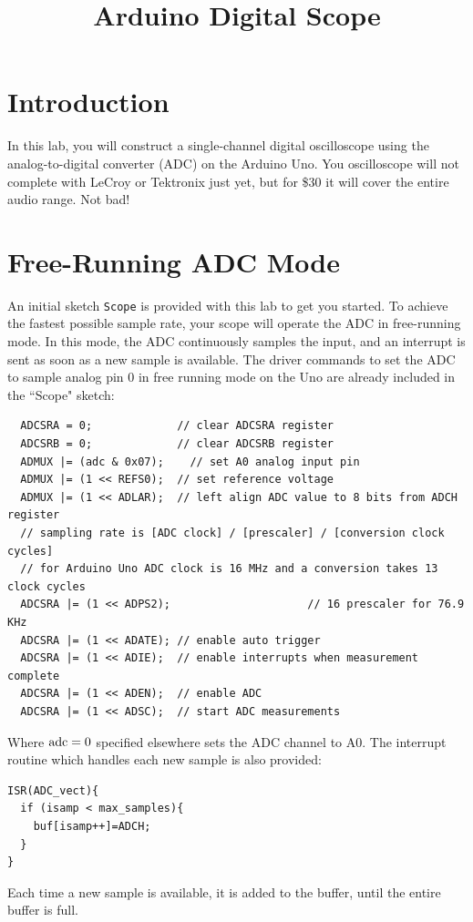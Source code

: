 \documentclass[12pt]{article}
\begin{document}
\title{Arduino Digital Scope} 

\maketitle

\section{Introduction}

In this lab, you will construct a single-channel digital oscilloscope using the analog-to-digital converter (ADC) on the Arduino Uno.  You oscilloscope will not complete with LeCroy or Tektronix just yet, but for \$30 it will cover the entire audio range.  Not bad!

\section{Free-Running ADC Mode}

An initial sketch {\tt Scope} is provided with this lab to get you started.  To achieve the fastest possible sample rate, your scope will operate the ADC in free-running mode.  In this mode, the ADC continuously samples the input, and an interrupt is sent as soon as a new sample is available.  The driver commands to set the ADC to sample analog pin 0 in free running mode on the Uno are already included in the ``Scope" sketch:
 \begin{verbatim}
  ADCSRA = 0;             // clear ADCSRA register
  ADCSRB = 0;             // clear ADCSRB register
  ADMUX |= (adc & 0x07);    // set A0 analog input pin
  ADMUX |= (1 << REFS0);  // set reference voltage
  ADMUX |= (1 << ADLAR);  // left align ADC value to 8 bits from ADCH register
  // sampling rate is [ADC clock] / [prescaler] / [conversion clock cycles]
  // for Arduino Uno ADC clock is 16 MHz and a conversion takes 13 clock cycles
  ADCSRA |= (1 << ADPS2);                     // 16 prescaler for 76.9 KHz
  ADCSRA |= (1 << ADATE); // enable auto trigger
  ADCSRA |= (1 << ADIE);  // enable interrupts when measurement complete
  ADCSRA |= (1 << ADEN);  // enable ADC
  ADCSRA |= (1 << ADSC);  // start ADC measurements
\end{verbatim}
Where $\rm adc=0$ specified elsewhere sets the ADC channel to A0.  The interrupt routine which handles each new sample is also provided:
\begin{verbatim}
ISR(ADC_vect){
  if (isamp < max_samples){
    buf[isamp++]=ADCH;
  }
}    
\end{verbatim}
Each time a new sample is available, it is added to the buffer, until the entire buffer is full. 
\end{document}
